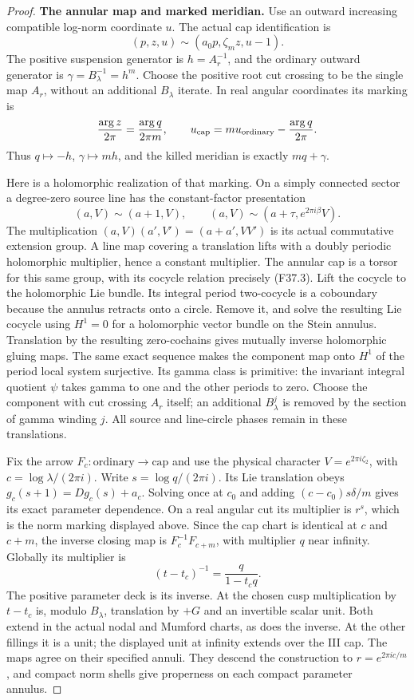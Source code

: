 \begin{proof}
\par\medskip\noindent\textbf{The annular map and marked meridian.}
Use an outward increasing compatible log-norm coordinate $u$.
The actual cap identification is
\[
       (p,z,u)\sim(a_0p,\zeta_mz,u-1).
\]
The positive suspension generator is $h=A_r^{-1}$, and the
ordinary outward generator is $\gamma=B_\lambda^{-1}=h^m$.
Choose the positive root cut crossing to be the single map
$A_r$, without an additional $B_\lambda$ iterate. In real
angular coordinates its marking is
\[
 \frac{\arg z}{2\pi}=\frac{\arg q}{2\pi m},\qquad
 u_{\rm cap}=m u_{\rm ordinary}-\frac{\arg q}{2\pi}.
\]
Thus $q\mapsto-h$, $\gamma\mapsto mh$, and the killed
meridian is exactly $mq+\gamma$.

Here is a holomorphic realization of that marking. On a simply
connected sector a degree-zero source line has the constant-factor
presentation
\[
 (a,V)\sim(a+1,V),\qquad
 (a,V)\sim(a+\tau,e^{2\pi i\beta}V).
\]
The multiplication $(a,V)(a',V')=(a+a',VV')$ is its actual
commutative extension group. A line map covering a translation
lifts with a doubly periodic holomorphic multiplier, hence a
constant multiplier. The annular cap is a torsor for this same
group, with its cocycle relation precisely (F37.3). Lift the
cocycle to the holomorphic Lie bundle. Its integral period
two-cocycle is a coboundary because the annulus retracts onto a
circle. Remove it, and solve the resulting Lie cocycle using
$H^1=0$ for a holomorphic vector bundle on the Stein annulus.
Translation by the resulting zero-cochains gives mutually inverse
holomorphic gluing maps. The same exact sequence makes the
component map onto $H^1$ of the period local system surjective.
Its gamma class is primitive: the invariant integral quotient
$\psi$ takes gamma to one and the other periods to zero.
Choose the component with cut crossing $A_r$ itself; an additional
$B_\lambda^j$ is removed by the section of gamma winding $j$.
All source and line-circle phases remain in these translations.

Fix the arrow $F_c:\text{ordinary}\to\text{cap}$ and use the
physical character $V=e^{2\pi i\zeta_2}$, with
$c=\log\lambda/(2\pi i)$. Write $s=\log q/(2\pi i)$.
Its Lie translation obeys $g_c(s+1)=Dg_c(s)+a_c$.
Solving once at $c_0$ and adding $(c-c_0)s\delta/m$ gives its
exact parameter dependence. On a real angular cut its multiplier
is $r^s$, which is the norm marking displayed above. Since the
cap chart is identical at $c$ and $c+m$, the inverse closing map
is $F_c^{-1}F_{c+m}$, with multiplier $q$ near infinity.
Globally its multiplier is
\[
                    (t-t_c)^{-1}=\frac{q}{1-t_cq}.
\]
The positive parameter deck is its inverse. At the chosen cusp
multiplication by $t-t_c$ is, modulo $B_\lambda$, translation
by $+G$ and an invertible scalar unit. Both extend in the actual
nodal and Mumford charts, as does the inverse. At the other
fillings it is a unit; the displayed unit at infinity extends
over the III cap. The maps agree on their specified annuli.
They descend the construction to $r=e^{2\pi ic/m}$, and compact
norm shells give properness on each compact parameter annulus.


\end{proof}
